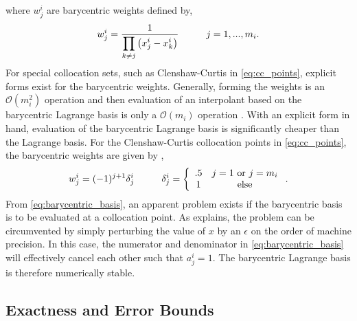 where $w_j^i$ are barycentric weights defined by,
\begin{equation} \label{eq:barycentric_weights}
    w_j^i = \frac{1}
     {\displaystyle \prod_{k \neq j}\left(x_j^i - x_k^i\right)}
      \hspace{1 cm} j=1,...,m_i.
\end{equation}
For special collocation sets, such as Clenshaw-Curtis in \ref{eq:cc_points}, explicit forms exist for the barycentric weights. Generally, forming the weights is an $\mathcal{O}(m_i^2)$ operation and then evaluation of an interpolant based on the barycentric Lagrange basis is only a $\mathcal{O}(m_i)$ operation \cite{BaryCentIntrp}. With an explicit form in hand, evaluation of the barycentric Lagrange basis is significantly cheaper than the Lagrange basis. For the Clenshaw-Curtis collocation points in \ref{eq:cc_points}, the barycentric weights are given by \cite{ChebyType2},
\begin{equation} \label{eq:barycentric_weights4_cc}
    w_j^i = (-1)^{j+1}\delta_j^i \hspace{1 cm}
     \delta_j^i = \left\{
                   \begin{array}{cc}
                    .5   & j=1 \text{ or } j=m_i \\
                    1   & \text{ else }  
				   \end{array}
				  \right. .                   
\end{equation}      
From \ref{eq:barycentric_basis}, an apparent problem exists if the barycentric basis is to be evaluated at a collocation point. As \cite{BaryCentIntrp} explains, the problem can be circumvented by simply perturbing the value of $x$ by an $\epsilon$ on the order of machine precision. In this case, the numerator and denominator in \ref{eq:barycentric_basis} will effectively cancel each other such that $a_j^i=1$. The barycentric Lagrange basis is therefore numerically stable.  

\subsection{Exactness and Error Bounds} \label{subsec:exactness_error}

